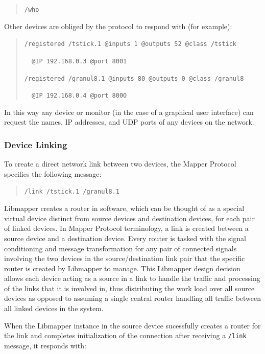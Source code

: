 \begin{quote}
\verb#/who#
\end{quote}

Other devices are obliged by the protocol to respond with (for example):

\begin{quote}
\verb#/registered /tstick.1 @inputs 1 @outputs 52 @class /tstick# 

\verb#  @IP 192.168.0.3 @port 8001#

\verb#/registered /granul8.1 @inputs 80 @outputs 0 @class /granul8#

\verb#  @IP 192.168.0.4 @port 8000#
\end{quote}

In this way any device or monitor (in the case of a graphical user interface) can request the names, IP addresses, and UDP ports of any devices on the network. 

\subsubsection{Device Linking}

To create a direct network link between two devices, the Mapper Protocol specifies the following message:

\begin{quote}
\verb#/link /tstick.1 /granul8.1#
\end{quote}

Libmapper creates a router in software, which can be thought of as a special virtual device distinct from source devices and destination devices, for each pair of linked devices. In Mapper Protocol terminology, a link is created between a source device and a destination device. Every router is tasked with the signal conditioning and message transformation for any pair of connected signals involving the two devices in the source/destination link pair that the specific router is created by Libmapper to manage. This Libmapper design decision allows each device acting as a source in a link to handle the traffic and processing of the links that it is involved in, thus distributing the work load over all source devices as opposed to assuming a single central router handling all traffic between all linked devices in the system.

When the Libmapper instance in the source device sucessfully creates a router for the link and completes initialization of the connection after receiving a \verb#/link# message, it responds with:

